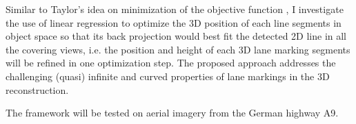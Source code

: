 Similar to Taylor’s idea on minimization of the objective function \cite{TaylorNov1995}, I investigate the use of linear regression to optimize the 3D position of each line segments in object space so that its back projection would best fit the detected 2D line in all the covering views, i.e. the position and height of each 3D lane marking segments will be refined in one optimization step. The proposed approach addresses the challenging (quasi) infinite and curved properties of lane markings in the 3D reconstruction.

The framework will be tested on aerial imagery from the German highway A9.%
